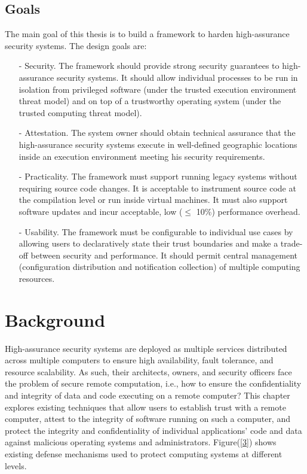 \documentclass[acmtog]{acmart}
\begin{document}
\subsection{Goals}
\raggedright The main goal of this thesis is to build a framework to harden high-assurance security systems. The design goals are:

\begin{itemize}
    \item[-] Security. The framework should provide strong security guarantees to high-assurance security systems. It should allow individual processes to be run in isolation from privileged software (under the trusted execution environment threat model) and on top of a trustworthy operating system (under the trusted computing threat model). 
    \item[-] Attestation. The system owner should obtain technical assurance that the high-assurance security systems execute in well-defined geographic locations inside an execution environment meeting his security requirements. 
    \item[-] Practicality. The framework must support running legacy systems without requiring source code changes. It is acceptable to instrument source code at the compilation level or run inside virtual machines. It must also support software updates and incur acceptable, low ($\le$ 10\%) performance overhead.
    \item[-] Usability. The framework must be configurable to individual use cases by allowing users to declaratively state their trust boundaries and make a trade-off between security and performance. It should permit central management (configuration distribution and notification collection) of multiple computing resources.
\end{itemize}

\section{Background}
\raggedright  High-assurance security systems are deployed as multiple services distributed across multiple computers to ensure high availability, fault tolerance, and resource scalability. As such, their architects, owners, and security officers face the problem of secure remote computation, i.e., how to ensure the confidentiality and integrity of data and code executing on a remote computer? This chapter explores existing techniques that allow users to establish trust with a remote computer, attest to the integrity of software running on such a computer, and protect the integrity and confidentiality of individual applications’ code and data against malicious operating systems and administrators. Figure(\ref{3}) shows existing defense mechanisms used to protect computing systems at different levels. 
\end{document}
